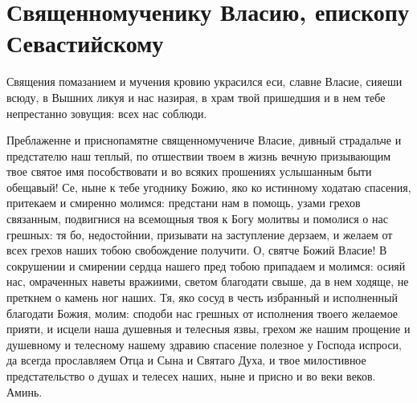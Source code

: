 


\section{Священномученику Власию, епископу Севастийскому}\begin{mymulticols}




Священия помазанием и мучения кровию украсился еси, славне Власие, сияеши всюду, в Вышних ликуя и нас назирая, в храм твой пришедшия и в нем тебе непрестанно зовущия: всех нас соблюди.




Преблаженне и приснопамятне священномучениче Власие, дивный страдальче и предстателю наш теплый, по отшествии твоем в жизнь вечную призывающим твое святое имя пособствовати и во всяких прошениях услышанным быти обещавый! Се, ныне к тебе угоднику Божию, яко ко истинному ходатаю спасения, притекаем и смиренно молимся: предстани нам в помощь, узами грехов связанным, подвигнися на всемощныя твоя к Богу молитвы и помолися о нас грешных: тя бо, недостойнии, призывати на заступление дерзаем, и желаем от всех грехов наших тобою свобождение получити. О, святче Божий Власие! В сокрушении и смирении сердца нашего пред тобою припадаем и молимся: осияй нас, омраченных наветы вражиими, светом благодати свыше, да в нем ходяще, не преткнем о камень ног наших. Тя, яко сосуд в честь избранный и исполненный благодати Божия, молим: сподоби нас грешных от исполнения твоего желаемое прияти, и исцели наша душевныя и телесныя язвы, грехом же нашим прощение и душевному и телесному нашему здравию спасение полезное у Господа испроси, да всегда прославляем Отца и Сына и Святаго Духа, и твое милостивное предстательство о душах и телесех наших, ныне и присно и во веки веков. Аминь.



\end{mymulticols}

\mychapterending

